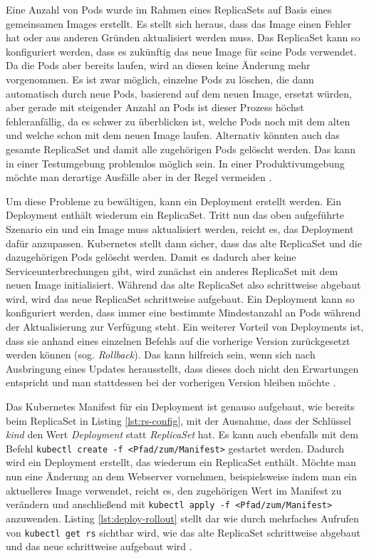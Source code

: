 \documentclass[11pt,a4paper]{article}
\begin{document}
Eine Anzahl von Pods wurde im Rahmen eines ReplicaSets auf Basis eines gemeinsamen Images erstellt.
Es stellt sich heraus, dass das Image einen Fehler hat oder aus anderen Gründen aktualisiert werden muss.
Das ReplicaSet kann so konfiguriert werden, dass es zukünftig das neue Image für seine Pods verwendet.
Da die Pods aber bereits laufen, wird an diesen keine Änderung mehr vorgenommen. Es ist zwar möglich,
einzelne Pods zu löschen, die dann automatisch durch neue Pods, basierend auf dem neuen Image, ersetzt würden, aber
gerade mit steigender Anzahl an Pods ist dieser Prozess höchst
fehleranfällig, da es schwer zu überblicken ist, welche Pods noch mit dem alten und welche schon mit dem
neuen Image laufen. Alternativ könnten auch das gesamte ReplicaSet und damit alle zugehörigen Pods gelöscht werden.
Das kann in einer Testumgebung problemlos möglich sein. In einer Produktivumgebung möchte man derartige
Ausfälle aber in der Regel vermeiden \cite{Schmeling_Dargatz_2022}. %

Um diese Probleme zu bewältigen, kann ein Deployment erstellt werden.
Ein Deployment enthält wiederum ein ReplicaSet. Tritt nun das oben aufgeführte Szenario ein und ein Image
muss aktualisiert werden, reicht es, das Deployment dafür anzupassen.
Kubernetes stellt dann sicher, dass das alte ReplicaSet und die dazugehörigen Pods gelöscht werden.
Damit es dadurch aber keine Serviceunterbrechungen gibt, wird zunächst ein anderes ReplicaSet mit dem neuen
Image initialisiert. Während das alte ReplicaSet also schrittweise abgebaut wird, wird das neue ReplicaSet
schrittweise aufgebaut. Ein Deployment kann so konfiguriert werden, dass immer eine bestimmte Mindestanzahl an
Pods während der Aktualisierung zur Verfügung steht.
Ein weiterer Vorteil von Deployments ist, dass sie anhand eines einzelnen Befehls auf die vorherige Version
zurückgesetzt werden können (sog. \emph{Rollback}). Das kann hilfreich sein, wenn sich nach Ausbringung eines
Updates herausstellt, dass dieses doch nicht den Erwartungen entspricht und man stattdessen bei der vorherigen
Version bleiben möchte \cite{Schmeling_Dargatz_2022}.

Das Kubernetes Manifest für ein Deployment ist genauso aufgebaut, wie bereits beim ReplicaSet in
Listing \ref{lst:rs-config}, mit der Ausnahme, dass der Schlüssel \emph{kind} den Wert
\emph{Deployment} statt \emph{ReplicaSet} hat. Es kann auch ebenfalls mit dem Befehl
\lstinline|kubectl create -f <Pfad/zum/Manifest>| gestartet werden.
Dadurch wird ein Deployment erstellt, das wiederum ein ReplicaSet enthält.
Möchte man nun eine Änderung an dem Webserver vornehmen, beispielsweise indem
man ein aktuelleres Image verwendet, reicht es, den zugehörigen Wert im Manifest
zu verändern und anschließend mit \lstinline|kubectl apply -f <Pfad/zum/Manifest>| anzuwenden.
Listing \ref{lst:deploy-rollout} stellt dar wie durch mehrfaches Aufrufen
von \lstinline|kubectl get rs| sichtbar wird, wie das alte
ReplicaSet schrittweise abgebaut und das neue schrittweise aufgebaut wird \cite{Schmeling_Dargatz_2022}.
\end{document}
